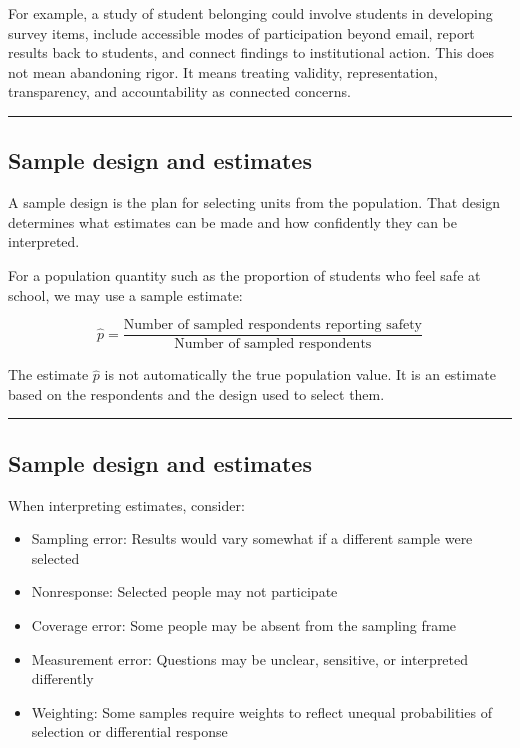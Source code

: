 \documentclass[
  letterpaper,
  DIV=11,
  numbers=noendperiod]{scrartcl}
\providecommand{\tightlist}{%
  \setlength{\itemsep}{0pt}\setlength{\parskip}{0pt}}\usepackage{longtable,booktabs,array}
\begin{document}
For example, a study of student belonging could involve students in
developing survey items, include accessible modes of participation
beyond email, report results back to students, and connect findings to
institutional action. This does not mean abandoning rigor. It means
treating validity, representation, transparency, and accountability as
connected concerns.

\begin{center}\rule{0.5\linewidth}{0.5pt}\end{center}

\subsection{Sample design and
estimates}\label{sample-design-and-estimates}

A sample design is the plan for selecting units from the population.
That design determines what estimates can be made and how confidently
they can be interpreted.

For a population quantity such as the proportion of students who feel
safe at school, we may use a sample estimate:

\[
\hat{p} = \frac{\text{Number of sampled respondents reporting safety}}{\text{Number of sampled respondents}}
\]

The estimate \(\hat{p}\) is not automatically the true population value.
It is an estimate based on the respondents and the design used to select
them.

\begin{center}\rule{0.5\linewidth}{0.5pt}\end{center}

\subsection{Sample design and
estimates}\label{sample-design-and-estimates-1}

When interpreting estimates, consider:

\begin{itemize}
\tightlist
\item
  Sampling error: Results would vary somewhat if a different sample were
  selected
\item
  Nonresponse: Selected people may not participate
\item
  Coverage error: Some people may be absent from the sampling frame
\item
  Measurement error: Questions may be unclear, sensitive, or interpreted
  differently
\item
  Weighting: Some samples require weights to reflect unequal
  probabilities of selection or differential response
\end{itemize}
\end{document}
